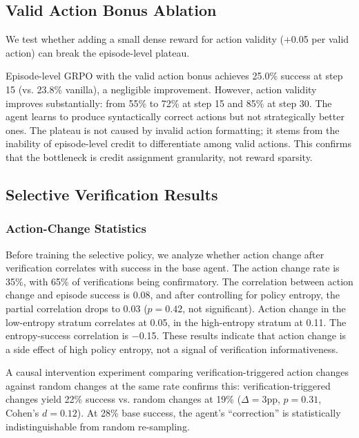 \documentclass[11pt]{article}
\begin{document}
\subsection{Valid Action Bonus Ablation}

We test whether adding a small dense reward for action validity ($+$0.05 per valid action) can break the episode-level plateau.

Episode-level GRPO with the valid action bonus achieves 25.0\% success at step 15 (vs. 23.8\% vanilla), a negligible improvement.
However, action validity improves substantially: from 55\% to 72\% at step 15 and 85\% at step 30.
The agent learns to produce syntactically correct actions but not strategically better ones.
The plateau is not caused by invalid action formatting; it stems from the inability of episode-level credit to differentiate among valid actions.
This confirms that the bottleneck is credit assignment granularity, not reward sparsity.

\subsection{Selective Verification Results}

\subsubsection{Action-Change Statistics}

Before training the selective policy, we analyze whether action change after verification correlates with success in the base agent.
The action change rate is 35\%, with 65\% of verifications being confirmatory.
The correlation between action change and episode success is 0.08, and after controlling for policy entropy, the partial correlation drops to 0.03 ($p = 0.42$, not significant).
Action change in the low-entropy stratum correlates at 0.05, in the high-entropy stratum at 0.11.
The entropy-success correlation is $-$0.15.
These results indicate that action change is a side effect of high policy entropy, not a signal of verification informativeness.

A causal intervention experiment comparing verification-triggered action changes against random changes at the same rate confirms this: verification-triggered changes yield 22\% success vs. random changes at 19\% ($\Delta = 3$pp, $p = 0.31$, Cohen's $d = 0.12$).
At 28\% base success, the agent's ``correction'' is statistically indistinguishable from random re-sampling.
\end{document}

